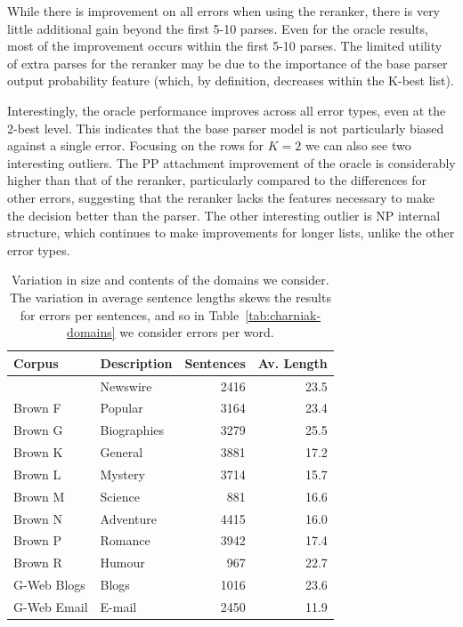 While there is improvement on all errors when using the reranker, there is very
little additional gain beyond the first 5-10 parses.  Even for the oracle
results, most of the improvement occurs within the first 5-10 parses.  The
limited utility of extra parses for the reranker may be due to the importance
of the base parser output probability feature (which, by definition, decreases
within the K-best list).

Interestingly, the oracle performance improves across all error types, even at
the 2-best level.  This indicates that the base parser model is not
particularly biased against a single error.  Focusing on the rows for $K=2$ we
can also see two interesting outliers.  The PP attachment improvement of the
oracle is considerably higher than that of the reranker, particularly compared
to the differences for other errors, suggesting that the reranker lacks the
features necessary to make the decision better than the parser.  The other
interesting outlier is NP internal structure, which continues to make
improvements for longer lists, unlike the other error types.

\begin{table}
\begin{center}
\begin{tabular}{|llrr|}
	\hline
		Corpus & Description & Sentences & Av. Length \\
	\hline
	\hline
		\wsj 23 & Newswire & 2416 & 23.5 \\
		Brown F & Popular & 3164 & 23.4 \\
		Brown G & Biographies & 3279 & 25.5 \\
		Brown K & General & 3881 & 17.2 \\
		Brown L & Mystery & 3714 & 15.7 \\
		Brown M & Science & 881 & 16.6 \\
		Brown N & Adventure & 4415 & 16.0 \\
		Brown P & Romance & 3942 & 17.4 \\
		Brown R & Humour & 967 & 22.7 \\
		G-Web Blogs & Blogs & 1016 & 23.6 \\
		G-Web Email & E-mail & 2450 & 11.9 \\
	\hline
\end{tabular}
\caption[Variation in size and contents of the domains we consider.]{ \label{tab:domain-info}
	Variation in size and contents of the domains we consider.	The variation in
	average sentence lengths skews the results for errors per sentences, and so
	in Table~\ref{tab:charniak-domains} we consider errors per word.
}
\end{center}
\end{table}


